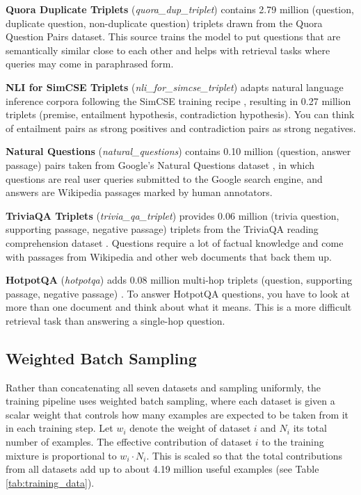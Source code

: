 \textbf{Quora Duplicate Triplets} (\textit{quora\_dup\_triplet}) contains 2.79 million (question, duplicate question, non-duplicate question) triplets drawn from the Quora Question Pairs dataset. This source trains the model to put questions that are semantically similar close to each other and helps with retrieval tasks where queries may come in paraphrased form.

\textbf{NLI for SimCSE Triplets} (\textit{nli\_for\_simcse\_triplet}) adapts natural language inference corpora following the SimCSE training recipe \cite{gao2021simcse}, resulting in 0.27 million triplets (premise, entailment hypothesis, contradiction hypothesis). You can think of entailment pairs as strong positives and contradiction pairs as strong negatives.

\textbf{Natural Questions} (\textit{natural\_questions}) contains 0.10 million (question, answer passage) pairs taken from Google's Natural Questions dataset \cite{kwiatkowski2019natural}, in which questions are real user queries submitted to the Google search engine, and answers are Wikipedia passages marked by human annotators.

\textbf{TriviaQA Triplets} (\textit{trivia\_qa\_triplet}) provides 0.06 million (trivia question, supporting passage, negative passage) triplets from the TriviaQA reading comprehension dataset \cite{joshi2017triviaqa}. Questions require a lot of factual knowledge and come with passages from Wikipedia and other web documents that back them up.

\textbf{HotpotQA} (\textit{hotpotqa}) adds 0.08 million multi-hop triplets (question, supporting passage, negative passage) \cite{yang2018hotpotqa}. To answer HotpotQA questions, you have to look at more than one document and think about what it means. This is a more difficult retrieval task than answering a single-hop question.

\subsection{Weighted Batch Sampling}

Rather than concatenating all seven datasets and sampling uniformly, the training pipeline uses weighted batch sampling, where each dataset is given a scalar weight that controls how many examples are expected to be taken from it in each training step. Let $w_i$ denote the weight of dataset $i$ and $N_i$ its total number of examples. The effective contribution of dataset $i$ to the training mixture is proportional to $w_i \cdot N_i$. This is scaled so that the total contributions from all datasets add up to about 4.19 million useful examples (see Table \ref{tab:training_data}).

